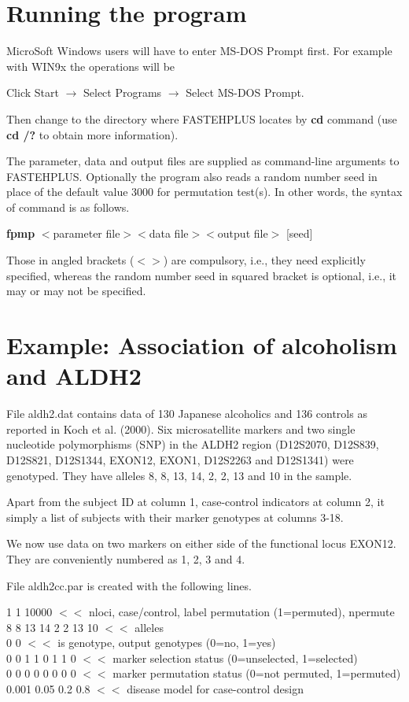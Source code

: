 \documentclass[11pt]{article}
\begin{document}
\section{Running the program}

MicroSoft Windows users will have to enter MS-DOS Prompt first.  For
example with WIN9x the operations will be

\medskip
Click Start $\rightarrow$ Select Programs $\rightarrow$ Select MS-DOS Prompt.

\medskip
Then change to the directory where FASTEHPLUS locates by {\bf cd} command (use
{\bf cd /?} to obtain more information).

The parameter, data and output files are supplied as command-line arguments to
FASTEHPLUS.  Optionally the program also reads a random number seed in place of
the default value 3000 for permutation test(s).  In other words, the syntax of
command is as follows.

\medskip
{\bf fpmp} $<$parameter file$> <$data file$> <$output file$>$ [seed]

\medskip
Those in angled brackets ($<>$) are compulsory, i.e., they need explicitly
specified, whereas the random number seed in squared bracket is optional, i.e.,
it may or may not be specified.


\section{Example: Association of alcoholism and ALDH2}

File aldh2.dat contains data of 130 Japanese alcoholics and 136 controls as
reported in Koch et al.  (2000).  Six microsatellite markers and two single
nucleotide polymorphisms (SNP) in the ALDH2 region (D12S2070, D12S839, D12S821,
D12S1344, EXON12, EXON1, D12S2263 and D12S1341) were genotyped.  They have
alleles 8, 8, 13, 14, 2, 2, 13 and 10 in the sample.

Apart from the subject ID at column 1, case-control indicators at column 2, it
simply a list of subjects with their marker genotypes at columns 3-18.

We now use data on two markers on either side of the functional locus EXON12.
They are conveniently numbered as 1, 2, 3 and 4.

File aldh2cc.par is created with the following lines.

\medskip
{\small{}  1  1  10000 $<<$ nloci, case/control, label permutation (1=permuted), npermute\\
8 8 13 14 2 2 13 10 $<<$ alleles\\
0 0          $<<$ is genotype, output genotypes (0=no, 1=yes)\\
0 0 1 1 0 1 1 0 $<<$ marker selection status (0=unselected, 1=selected)\\
0 0 0 0 0 0 0 0 $<<$ marker permutation status (0=not permuted, 1=permuted)\\
0.001 0.05 0.2 0.8 $<<$ disease model for case-control design\\
}
\end{document}
